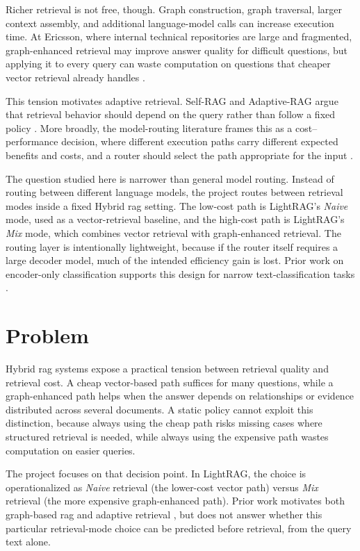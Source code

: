 \documentclass[english, bibtex]{kththesis}               %
\numberwithin{listing}{chapter}
\begin{document}
Richer retrieval is not free, though. Graph construction, graph traversal, larger context assembly, and additional language-model calls can increase execution time. At Ericsson, where internal technical repositories are large and fragmented, graph-enhanced retrieval may improve answer quality for difficult questions, but applying it to every query can waste computation on questions that cheaper vector retrieval already handles \cite{jeong2024adaptiverag,hu2024routerbench}.

This tension motivates adaptive retrieval. Self-RAG and Adaptive-RAG argue that retrieval behavior should depend on the query rather than follow a fixed policy \cite{asai2023selfrag,jeong2024adaptiverag}. More broadly, the model-routing literature frames this as a cost--performance decision, where different execution paths carry different expected benefits and costs, and a router should select the path appropriate for the input \cite{hu2024routerbench}.

The question studied here is narrower than general model routing. Instead of routing between different language models, the project routes between retrieval modes inside a fixed Hybrid \gls{rag} setting. The low-cost path is LightRAG's \emph{Naive} mode, used as a vector-retrieval baseline, and the high-cost path is LightRAG's \emph{Mix} mode, which combines vector retrieval with graph-enhanced retrieval. The routing layer is intentionally lightweight, because if the router itself requires a large decoder model, much of the intended efficiency gain is lost. Prior work on encoder-only classification supports this design for narrow text-classification tasks \cite{benayas2024encoder}.

\section{Problem}
\label{sec:problem}

Hybrid \gls{rag} systems expose a practical tension between retrieval quality and retrieval cost. A cheap vector-based path suffices for many questions, while a graph-enhanced path helps when the answer depends on relationships or evidence distributed across several documents. A static policy cannot exploit this distinction, because always using the cheap path risks missing cases where structured retrieval is needed, while always using the expensive path wastes computation on easier queries.

The project focuses on that decision point. In LightRAG, the choice is operationalized as \emph{Naive} retrieval (the lower-cost vector path) versus \emph{Mix} retrieval (the more expensive graph-enhanced path). Prior work motivates both graph-based \gls{rag} and adaptive retrieval \cite{edge2024graphrag,lightrag2024,asai2023selfrag,jeong2024adaptiverag}, but does not answer whether this particular retrieval-mode choice can be predicted before retrieval, from the query text alone.
\end{document}
